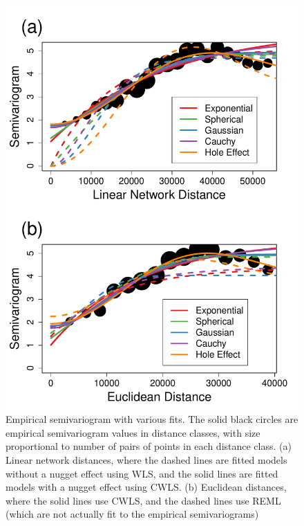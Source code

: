 \documentclass[11pt, titlepage]{article}\usepackage[]{graphicx}\usepackage[]{color}
\begin{document}
\begin{spacing}{1.9}
\begin{flushleft}
\begin{singlespace}
	\begin{figure}[H]
	  \begin{center}
	    \includegraphics[width=.8\linewidth]{figure/Fig-empSemivar-1.pdf}
	  \end{center}
	  \caption{Empirical semivariogram with various fits. The solid black circles are empirical semivariogram values in distance classes, with size proportional to number of pairs of points in each distance class. (a) Linear network distances, where the dashed lines are fitted models without a nugget effect using WLS, and the solid lines are fitted models with a nugget effect using CWLS. (b) Euclidean distances, where the solid lines use CWLS, and the dashed lines use REML (which are not actually fit to the empirical semivariograms) \label{fig:empsvgm}}
  \end{figure}




\end{singlespace}
\end{flushleft}
\end{spacing}
\end{document}

